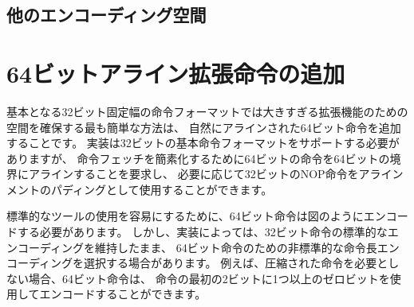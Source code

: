 \begin{comment}
\subsection*{Other spaces}
\end{comment}
\subsection*{他のエンコーディング空間}

\begin{comment}
Smaller spaces are available under certain major opcodes, and not all
minor opcodes are entirely filled.
\end{comment}

\begin{comment}
\section{Adding aligned 64-bit instruction extensions}
\end{comment}
\section{64ビットアライン拡張命令の追加}

\begin{comment}
The simplest approach to provide space for extensions that are too
large for the base 32-bit fixed-width instruction format is to add
naturally aligned 64-bit instructions.  The implementation must still
support the 32-bit base instruction format, but can require that
64-bit instructions are aligned on 64-bit boundaries to simplify
instruction fetch, with a 32-bit NOP instruction used as alignment
padding where necessary.
\end{comment}
基本となる32ビット固定幅の命令フォーマットでは大きすぎる拡張機能のための空間を確保する最も簡単な方法は、
自然にアラインされた64ビット命令を追加することです。
実装は32ビットの基本命令フォーマットをサポートする必要がありますが、
命令フェッチを簡素化するために64ビットの命令を64ビットの境界にアラインすることを要求し、
必要に応じて32ビットのNOP命令をアラインメントのパディングとして使用することができます。

\begin{comment}
To simplify use of standard tools, the 64-bit instructions should be
encoded as described in Figure~\ref{instlengthcode}.  However, an
implementation might choose a non-standard instruction-length encoding
for 64-bit instructions, while retaining the standard encoding for
32-bit instructions.  For example, if compressed instructions are not
required, then a 64-bit instruction could be encoded using one or more
zero bits in the first two bits of an instruction.
\end{comment}
標準的なツールの使用を容易にするために、64ビット命令は図のようにエンコードする必要があります。
しかし、実装によっては、32ビット命令の標準的なエンコーディングを維持したまま、
64ビット命令のための非標準的な命令長エンコーディングを選択する場合があります。
例えば、圧縮された命令を必要としない場合、64ビット命令は、
命令の最初の2ビットに1つ以上のゼロビットを使用してエンコードすることができます。

